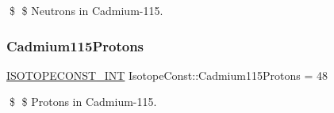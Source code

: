 \$ \$ Neutrons in Cadmium-\/115. \mbox{\label{group___isotope_const-_cadmium-_cd115_gadcd91bfe35dfe544389a0aa8db02131b}} 
\subsubsection{\texorpdfstring{Cadmium115\+Protons}{Cadmium115Protons}}
{\footnotesize\ttfamily \mbox{\hyperlink{group___isotope_const-_macros_ga5f18360b3e99483a35c32d789e62621c}{I\+S\+O\+T\+O\+P\+E\+C\+O\+N\+S\+T\+\_\+\+I\+NT}} Isotope\+Const\+::\+Cadmium115\+Protons = 48}

\$ \$ Protons in Cadmium-\/115. 
